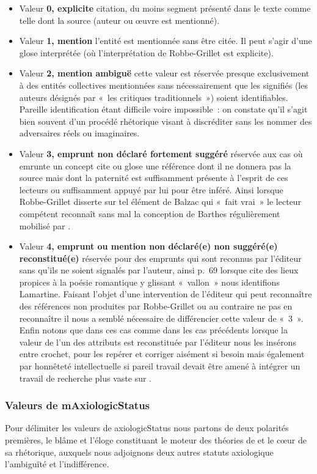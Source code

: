 \documentclass[12pt, a4paper]{article}
\begin{document}
\begin{itemize}
    \item Valeur \textbf{0, explicite} citation, du moins segment présenté dans le texte comme telle dont la source (auteur ou œuvre est mentionné).
    \item Valeur \textbf{1, mention} l'entité est mentionnée sans être citée. Il peut s'agir d'une glose interprétée (où l'interprétation de Robbe-Grillet est explicite).
    \item Valeur \textbf{2, mention ambiguë} cette valeur est réservée presque exclusivement à des entités collectives mentionnées sans nécessairement que les signifiés (les auteurs désignés par «~les critiques traditionnels~») soient identifiables. Pareille identification étant difficile voire impossible~: on constate qu'il s'agit bien souvent d'un procédé rhétorique visant à discréditer sans les nommer des adversaires réels ou imaginaires.
    \item Valeur \textbf{3, emprunt non déclaré fortement suggéré} réservée aux cas où \robbe{} emrunte un concept cite ou glose une référence dont il ne donnera pas la source mais dont la paternité est suffisamment présente à l'esprit de ces lecteurs ou suffisamment appuyé par lui pour être inféré. Ainsi lorsque Robbe-Grillet disserte sur tel élément de Balzac qui «~fait vrai~» le lecteur compétent reconnaît sans mal la conception de Barthes régulièrement mobilisé par \robbe.
    \item Valeur \textbf{4, emprunt ou mention non déclaré(e) non suggéré(e) reconstitué(e)} réservée pour des emprunts qui sont reconnus par l'éditeur sans qu'ils ne soient signalés par l'auteur, ainsi p.~69 lorsque \robbe{} cite des lieux propices à la poésie romantique y glissant «~vallon~» nous identifions Lamartine. Faisant l'objet d'une intervention de l'éditeur qui peut reconnaître des références non produites par Robbe-Grillet ou au contraire ne pas en reconnaître il nous a semblé nécessaire de différencier cette valeur de «~3~». Enfin notons que dans ces cas comme dans les cas précédents lorsque la valeur de l'un des attributs est reconstituée par l'éditeur nous les insérons entre crochet, pour les repérer et corriger aisément si besoin mais également par honnêteté intellectuelle si pareil travail devait être amené à intégrer un travail de recherche plus vaste sur \punr{}.
\end{itemize}

\subsubsection{Valeurs de mAxiologicStatus}
Pour délimiter les valeurs de axiologicStatus nous partons de deux polarités premières, le blâme et l'éloge constituant le moteur des théories de \robbe{} et le cœur de sa rhétorique, auxquels nous adjoignons deux autres statuts axiologique l'ambiguïté et l'indifférence. 
\end{document}
